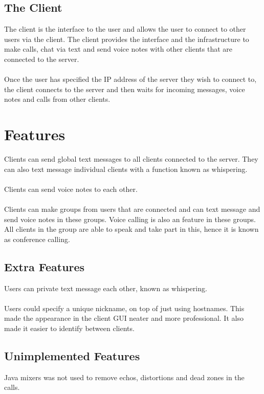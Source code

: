 \documentclass[13pt]{article}
\begin{document}
\subsection{The Client}

The client is the interface to the user and allows the user to connect to other users via the client. The client provides the interface and the infrastructure to make calls, chat via text and send voice notes with other clients that are connected to the server.
\\\\
Once the user has specified the IP address of the server they wish to connect to, the client connects to the server and then waits for incoming messages, voice notes and calls from other clients.

\section{Features}

Clients can send global text messages to all clients connected to the server. They can also text message individual clients with a function known as whispering.
\\\\
Clients can send voice notes to each other.
\\\\
Clients can make groups from users that are connected and can text message and send voice notes in these groups. Voice calling is also an feature in these groups. All clients in the group are able to speak and take part in this, hence it is known as conference calling.
\subsection{Extra Features}

Users can private text message each other, known as whispering.
\\\\
Users could specify a unique nickname, on top of just using hostnames. This made the appearance in the client GUI neater and more professional. It also made it easier to identify between clients.

\subsection{Unimplemented Features}

Java mixers was not used to remove echos, distortions and dead zones in the calls.
\end{document}
